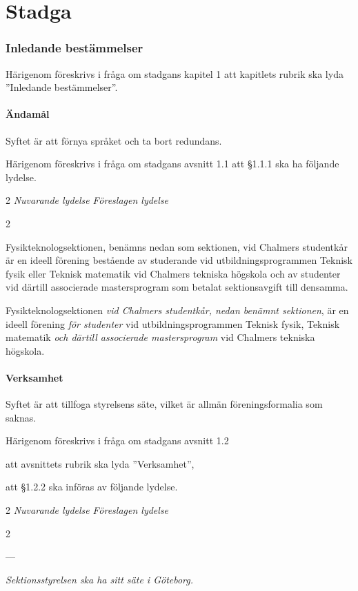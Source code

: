 \documentclass{article}
\newenvironment{lydelse}
    {\begin{paracol}{2}%
        \emph{Nuvarande lydelse}%
        \switchcolumn%
        \emph{Föreslagen lydelse}%
    \end{paracol}%
    \begin{enumerate}[label=\thesubsection.\arabic*]%
    \begin{paracol}{2}%
    }{\end{paracol}\end{enumerate}}
\begin{document}
\part{Stadga}
\section{Inledande bestämmelser}
Härigenom föreskrivs i fråga om stadgans kapitel 1 att kapitlets rubrik ska lyda ''Inledande bestämmelser''.


\subsection{Ändamål}
Syftet är att förnya språket och ta bort redundans.

Härigenom föreskrivs i fråga om stadgans avsnitt 1.1 att \S 1.1.1 ska ha följande lydelse.

\begin{lydelse}
    \item Fysikteknologsektionen, benämns nedan som sektionen, vid Chalmers studentkår är en ideell förening bestående av studerande vid utbildningsprogrammen Teknisk fysik eller Teknisk matematik vid Chalmers tekniska högskola och av studenter vid därtill associerade mastersprogram som betalat sektionsavgift till densamma.
\switchcolumn
    \item Fysikteknologsektionen \emph{vid Chalmers studentkår, nedan benämnt sektionen}, är en ideell förening \emph{för studenter} vid utbildningsprogrammen Teknisk fysik, Teknisk matematik \emph{och därtill associerade mastersprogram} vid Chalmers tekniska högskola.
\end{lydelse}

\subsection{Verksamhet}
Syftet är att tillfoga styrelsens säte, vilket är allmän föreningsformalia som saknas.

Härigenom föreskrivs i fråga om stadgans avsnitt 1.2
\begin{dels}
    \item att avsnittets rubrik ska lyda ''Verksamhet'',
    \item att \S 1.2.2 ska införas av följande lydelse.
\end{dels}

\begin{lydelse}
    ---
    \switchcolumn
    \setcounter{enumi}{1}
    \item \emph{Sektionsstyrelsen ska ha sitt säte i Göteborg.}
\end{lydelse}
\end{document}
